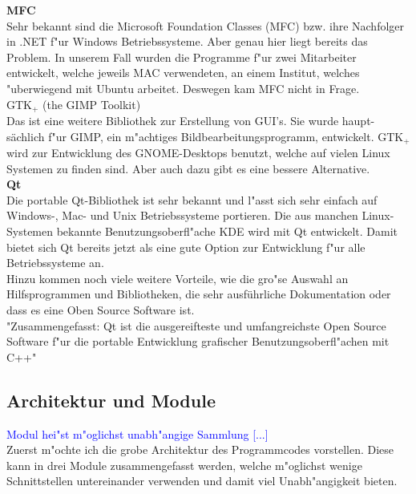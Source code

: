 \documentclass[11pt, a4paper, german]{article}
\theoremstyle{plain}
\begin{document}
	\textbf{MFC}\\
	Sehr bekannt sind die Microsoft Foundation Classes (MFC) bzw. ihre Nachfolger in .NET f"ur Windows Betriebssysteme. Aber genau hier liegt bereits das Problem. In unserem Fall wurden die Programme f"ur zwei Mitarbeiter entwickelt, welche jeweils MAC verwendeten, an einem Institut, welches "uberwiegend mit Ubuntu arbeitet. Deswegen kam MFC nicht in Frage.\\
	
	\textbf{$ \text{GTK}_+ $ }(the GIMP Toolkit)\\
	Das ist eine weitere Bibliothek zur Erstellung von GUI's. Sie wurde haupt-sächlich f"ur GIMP, ein m"achtiges Bildbearbeitungsprogramm, entwickelt. $ \text{GTK}_+ $ wird zur Entwicklung des GNOME-Desktops benutzt, welche auf vielen Linux Systemen zu finden sind. Aber auch dazu gibt es eine bessere Alternative.\\
	
	\textbf{Qt}\\
	Die portable Qt-Bibliothek ist sehr bekannt und l"asst sich sehr einfach auf Windows-, Mac- und Unix Betriebssysteme portieren. Die aus manchen Linux-Systemen bekannte Benutzungsoberfl"ache KDE wird mit Qt entwickelt. Damit bietet sich Qt bereits jetzt als eine gute Option zur Entwicklung f"ur alle Betriebssysteme an.\\
	Hinzu kommen noch viele weitere Vorteile, wie die gro"se Auswahl an Hilfsprogrammen und Bibliotheken, die sehr ausführliche Dokumentation oder dass es eine Oben Source Software ist.\\
	"{}Zusammengefasst: Qt ist die ausgereifteste und umfangreichste Open Source Software f"ur die portable Entwicklung grafischer Benutzungsoberfl"achen mit C++"{}\cite[S.452]{breymann2011c++}

	\subsection{Architektur und Module}
	\textcolor{blue}{Modul hei"st m"oglichst unabh"angige Sammlung [...]}\\
	Zuerst m"ochte ich die grobe Architektur des Programmcodes vorstellen. Diese kann in drei Module zusammengefasst werden, welche m"oglichst wenige Schnittstellen untereinander verwenden und damit viel Unabh"angigkeit bieten.
	
\end{document}
